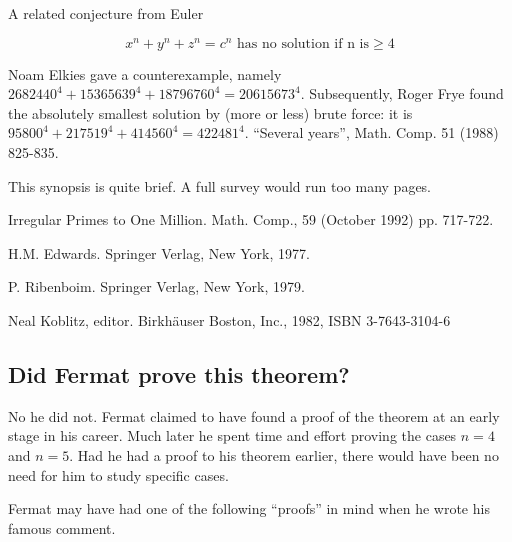 A related conjecture from Euler

\[ x^n + y^n + z^n = c^n \mbox{ has no solution if n is} \geq 4 \]

Noam Elkies gave a counterexample, namely $2682440^4 + 15365639^4 +
18796760^4 = 20615673^4$. Subsequently, Roger Frye found the absolutely
smallest solution by (more or less) brute force: it is $95800^4 +
217519^4 + 414560^4 = 422481^4$.  ``Several years'', Math. Comp. 51
(1988) 825-835.


This synopsis is quite brief. A full survey would run too many pages.

\Ref

 {Irregular
  Primes to One Million.}  {Math. Comp.,} {59 (October 1992)
  pp. 717-722.}

 {H.M. Edwards.} {Springer Verlag, New York, 1977.}

 {P. Ribenboim.}
{Springer Verlag, New York, 1979.}

 {Neal Koblitz,
  editor.} {Birkh\"auser Boston, Inc., 1982, ISBN 3-7643-3104-6}

\subsection{Did Fermat prove this theorem?}

No he did not. Fermat claimed to have found a proof of the theorem at an
early stage in his career. Much later he spent time and effort proving
the cases $n=4$ and $n=5$. Had he had a proof to his theorem earlier,
there would have been no need for him to study specific cases.

Fermat may have had one of the following ``proofs'' in mind when he
wrote his famous comment.

